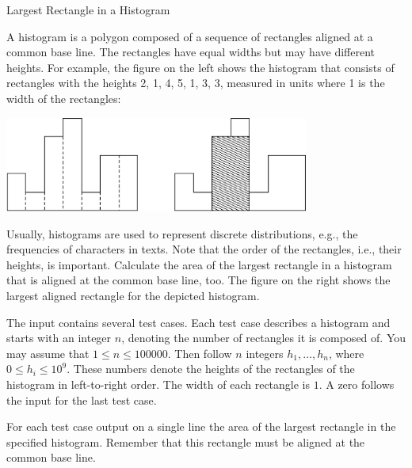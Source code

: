 Largest Rectangle in a Histogram

A histogram is a polygon composed of a sequence of rectangles aligned at a common base line. The rectangles have equal widths but may have different heights. For example, the figure on the left shows the histogram that consists of rectangles with the heights 2, 1, 4, 5, 1, 3, 3, measured in units where 1 is the width of the rectangles:

\begin{center}
    \def \htmlPixelsInCm {45}
    \includegraphics[width=10cm]{image.eps}
\end{center}

Usually, histograms are used to represent discrete distributions, e.g., the frequencies of characters in texts. Note that the order of the rectangles, i.e., their heights, is important. Calculate the area of the largest rectangle in a histogram that is aligned at the common base line, too. The figure on the right shows the largest aligned rectangle for the depicted histogram.

The input contains several test cases. Each test case describes a histogram and starts with an integer $n$, denoting the number of rectangles it is composed of. You may assume that $1 \leq n \leq 100000$. Then follow $n$ integers $h_1, \ldots, h_n$, where $0 \leq h_i \leq 10^9$. These numbers denote the heights of the rectangles of the histogram in left-to-right order. The width of each rectangle is $1$. A zero follows the input for the last test case.

For each test case output on a single line the area of the largest rectangle in the specified histogram. Remember that this rectangle must be aligned at the common base line.